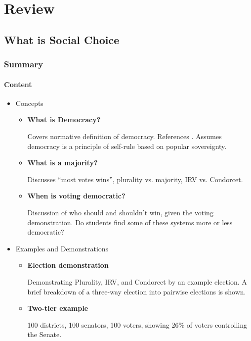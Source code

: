 \part{Review}

\chapter{What is Social Choice}

\section{Summary}

\subsection{Content}

\begin{itemize}
    \item Concepts
    \begin{itemize}
        \item \textbf{What is Democracy?}

        Covers normative definition of democracy.  References \autocite{Kassner2006}.  Assumes democracy is a principle of self-rule based on popular sovereignty.

        \item \textbf{What is a majority?}

        Discusses ``most votes wins'', plurality vs. majority, IRV vs. Condorcet.

        \item \textbf{When is voting democratic?}

        Discussion of who should and shouldn't win, given the voting demonstration.  Do students find some of these systems more or less democratic?
    \end{itemize}

    \item Examples and Demonstrations
    \begin{itemize}
        \item \textbf{Election demonstration}

        Demonstrating Plurality, IRV, and Condorcet by an example election.  A brief breakdown of a three-way election into pairwise elections is shown.

        \item \textbf{Two-tier example}

        100 districts, 100 senators, 100 voters, showing 26\% of voters controlling the Senate.
    \end{itemize}
\end{itemize}

